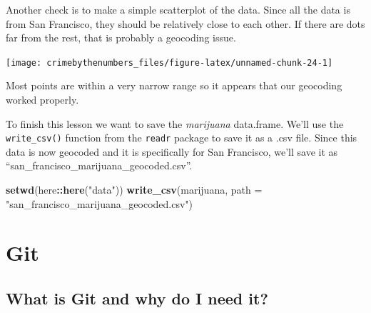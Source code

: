 \documentclass[
  12pt,
]{book}
\newenvironment{Shaded}{\begin{snugshade}}{\end{snugshade}}
\newcommand{\DataTypeTok}[1]{\textcolor[rgb]{0.27,0.27,0.27}{#1}}
\newcommand{\KeywordTok}[1]{\textcolor[rgb]{0.27,0.27,0.27}{\textbf{#1}}}
\newcommand{\NormalTok}[1]{#1}
\newcommand{\OperatorTok}[1]{\textcolor[rgb]{0.43,0.43,0.43}{\textbf{#1}}}
\newcommand{\StringTok}[1]{\textcolor[rgb]{0.5,0.5,0.5}{#1}}
\begin{document}
Another check is to make a simple scatterplot of the data. Since all the data is from San Francisco, they should be relatively close to each other. If there are dots far from the rest, that is probably a geocoding issue.

\begin{Shaded}
\end{Shaded}

\begin{center}\texttt{[image: crimebythenumbers\_files/figure-latex/unnamed-chunk-24-1]} \end{center}

Most points are within a very narrow range so it appears that our geocoding worked properly.

To finish this lesson we want to save the \emph{marijuana} data.frame. We'll use the \texttt{write\_csv()} function from the \texttt{readr} package to save it as a .csv file. Since this data is now geocoded and it is specifically for San Francisco, we'll save it as ``san\_francisco\_marijuana\_geocoded.csv''.

\begin{Shaded}
\begin{Highlighting}[]
\KeywordTok{setwd}\NormalTok{(here}\OperatorTok{::}\KeywordTok{here}\NormalTok{(}\StringTok{"data"}\NormalTok{))}
\KeywordTok{write\_csv}\NormalTok{(marijuana, }\DataTypeTok{path =} \StringTok{"san\_francisco\_marijuana\_geocoded.csv"}\NormalTok{)}
\end{Highlighting}
\end{Shaded}

\hypertarget{git}{%
\chapter{Git}\label{git}}

\hypertarget{what-is-git-and-why-do-i-need-it}{%
\section{What is Git and why do I need it?}\label{what-is-git-and-why-do-i-need-it}}
\end{document}
